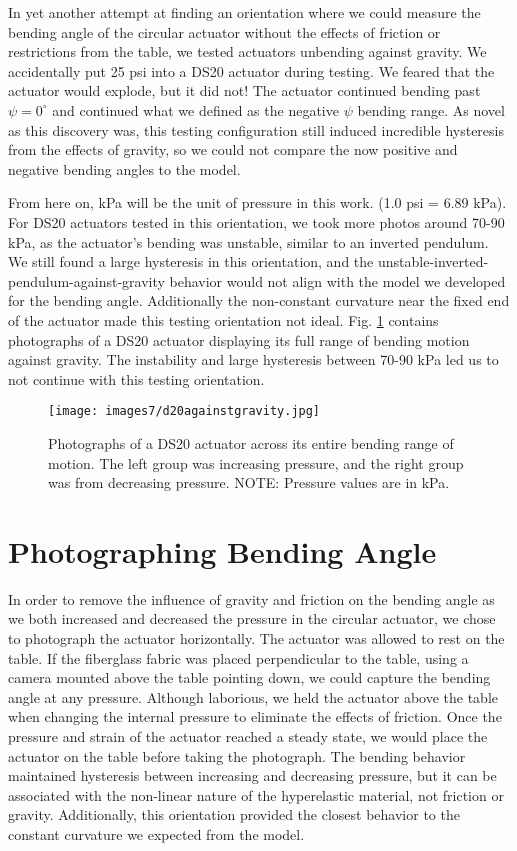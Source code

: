 In yet another attempt at finding an orientation where we could measure the bending angle of the circular actuator without the effects of friction or restrictions from the table, we tested actuators unbending against gravity. We accidentally put 25 psi into a DS20 actuator during testing. We feared that the actuator would explode, but it did not! The actuator continued bending past $\psi=0^\circ$ and continued what we defined as the negative $\psi$ bending range. As novel as this discovery was, this testing configuration still induced incredible hysteresis from the effects of gravity, so we could not compare the now positive and negative bending angles to the model. 

From here on, kPa will be the unit of pressure in this work. (1.0 psi = 6.89 kPa). For DS20 actuators tested in this orientation, we took more photos around 70-90 kPa, as the actuator's bending was unstable, similar to an inverted pendulum. We still found a large hysteresis in this orientation, and the unstable-inverted-pendulum-against-gravity behavior would not align with the model we developed for the bending angle. Additionally the non-constant curvature near the fixed end of the actuator made this testing orientation not ideal. Fig. \ref{fig:d20againstgravity} contains photographs of a DS20 actuator displaying its full range of bending motion against gravity. The instability and large hysteresis between 70-90 kPa led us to not continue with this testing orientation. 

\begin{figure}[ht]
    \centering
     \texttt{[image: images7/d20againstgravity.jpg]}
    \caption{Photographs of a DS20 actuator across its entire bending range of motion. The left group was increasing pressure, and the right group was from decreasing pressure. NOTE: Pressure values are in kPa.}
    \label{fig:d20againstgravity}
\end{figure}

\clearpage
\section{Photographing Bending Angle}

In order to remove the influence of gravity and friction on the bending angle as we both increased and decreased the pressure in the circular actuator, we chose to photograph the actuator horizontally. The actuator was allowed to rest on the table. If the fiberglass fabric was placed perpendicular to the table, using a camera mounted above the table pointing down, we could capture the bending angle at any pressure. Although laborious, we held the actuator above the table when changing the internal pressure to eliminate the effects of friction. Once the pressure and strain of the actuator reached a steady state, we would place the actuator on the table before taking the photograph. The bending behavior maintained hysteresis between increasing and decreasing pressure, but it can be associated with the non-linear nature of the hyperelastic material, not friction or gravity. Additionally, this orientation provided the closest behavior to the constant curvature we expected from the model. 

